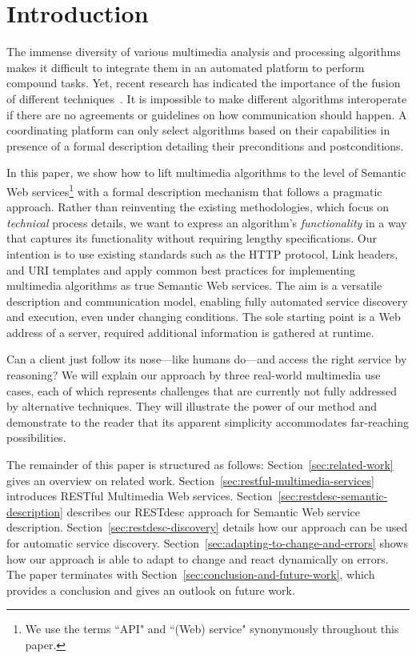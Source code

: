 \documentclass[runningheads,a4paper, twocolumn]{llncs}
\begin{document}

\section{Introduction} \label{sec:introduction}
The immense diversity of various multimedia analysis and processing algorithms makes it difficult to integrate them in an automated platform to perform compound tasks. Yet, recent research has indicated the importance of the fusion of different techniques~\cite{Atrey:2010p3072}. It is impossible to make different algorithms interoperate if there are no agreements or guidelines on how communication should happen. A coordinating platform can only select algorithms based on their capabilities in presence of a formal description detailing their preconditions and postconditions.

In this paper, we show how to lift multimedia algorithms to the level of Semantic Web services\footnote{We use the terms ``API" and ``(Web) service" synonymously throughout this paper.} with a formal description mechanism that follows a pragmatic approach. Rather than reinventing the existing methodologies, which focus on \emph{technical} process details, we want to express an algorithm's \emph{functionality} in a way that captures its functionality without requiring lengthy specifications. Our intention is to use existing standards such as the HTTP protocol, Link headers, and URI templates and apply common best practices for implementing multimedia algorithms as true Semantic Web services. The aim is a versatile description and communication model, enabling fully automated service discovery and execution, even under changing conditions. The sole starting point is a Web address of a server, required additional information is gathered at runtime.

Can a client just follow its nose---like humans do---and access the right service by reasoning? We will explain our approach by three real-world multimedia use cases, each of which represents challenges that are currently not fully addressed by alternative techniques. They will illustrate the power of our method and demonstrate  to the reader that its apparent simplicity accommodates far-reaching possibilities.

The remainder of this paper is structured as follows: Section~\ref{sec:related-work} gives an overview on related work. Section~\ref{sec:restful-multimedia-services} introduces RESTful Multimedia Web services. Section~\ref{sec:restdesc-semantic-description} describes our RESTdesc approach for Semantic Web service description. Section~\ref{sec:restdesc-discovery} details how our approach can be used for automatic service discovery. Section~\ref{sec:adapting-to-change-and-errors} shows how our approach is able to adapt to change and react dynamically on errors. The paper terminates with Section~\ref{sec:conclusion-and-future-work}, which provides a conclusion and gives an outlook on future work.
\end{document}
